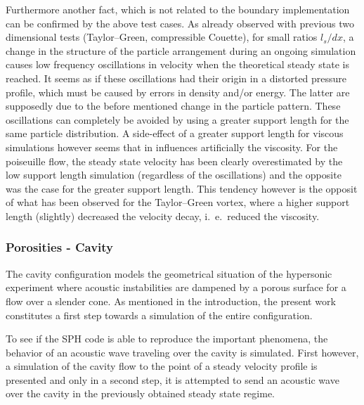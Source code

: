 \documentclass{report}
\begin{document}
Furthermore another fact, which is not related to the boundary implementation can be confirmed by the above test cases. As already observed with previous two dimensional tests (Taylor--Green, compressible Couette), for small ratios $l_s/dx$, a change in the structure of the particle arrangement during an ongoing simulation causes low frequency oscillations in velocity when the theoretical steady state is reached. It seems as if these oscillations had their origin in a distorted pressure profile, which must be caused by errors in density and/or energy. The latter are supposedly due to the before mentioned change in the particle pattern. 
These oscillations can completely be avoided by using a greater support length for the same particle distribution. A side-effect of a greater support length for viscous simulations however seems that in influences artificially the viscosity. For the poiseuille flow, the steady state velocity has been clearly overestimated by the low support length simulation (regardless of the oscillations) and the opposite was the case for the greater support length. This tendency however is the opposit of what has been observed for the Taylor--Green vortex, where a higher support length (slightly) decreased the velocity decay, i.\ e.\ reduced the viscosity.

\subsubsection{Porosities - Cavity}
The cavity configuration models the geometrical situation of the hypersonic experiment where acoustic instabilities are dampened by a porous surface for a flow over a slender cone. As mentioned in the introduction, the present work constitutes a first step towards a simulation of the entire configuration.


 


To see if the SPH code is able to reproduce the important phenomena, the behavior of an acoustic wave traveling over the cavity is simulated. First however, a simulation of the cavity flow to the point of a steady velocity profile is presented and only in a second step, it is attempted to send an acoustic wave over the cavity in the previously obtained steady state regime.


\end{document}
